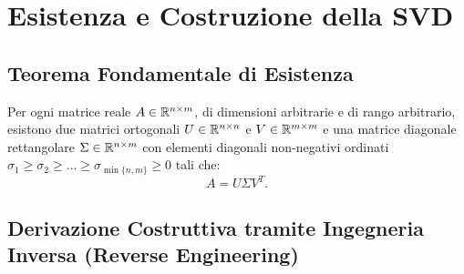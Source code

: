 \FloatBarrier
\section{Esistenza e Costruzione della SVD}
\label{sec:svd-esistenza-costruzione}

\subsection{Teorema Fondamentale di Esistenza}

\begin{theorem}
\label{thm:esistenza-svd}
Per ogni matrice reale $A \in \mathbb{R}^{n \times m}$, di dimensioni arbitrarie e di rango arbitrario, esistono due matrici ortogonali $U \in \mathbb{R}^{n \times n}$ e $V \in \mathbb{R}^{m \times m}$ e una matrice diagonale rettangolare $\Sigma \in \mathbb{R}^{n \times m}$ con elementi diagonali non-negativi ordinati $\sigma_1 \ge \sigma_2 \ge \dots \ge \sigma_{\min\{n,m\}} \ge 0$ tali che:
\begin{equation}
    A = U \Sigma V^T.
\end{equation}
\end{theorem}

\subsection{Derivazione Costruttiva tramite Ingegneria Inversa (Reverse Engineering)}

